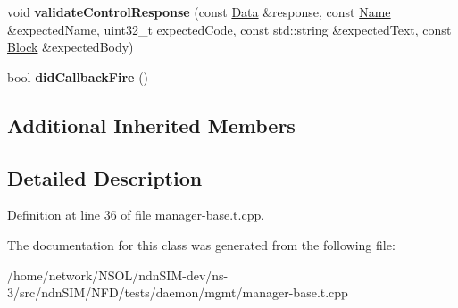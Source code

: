 \begin{DoxyCompactItemize}
\item 
void {\bfseries validate\+Control\+Response} (const \hyperlink{classndn_1_1Data}{Data} \&response, const \hyperlink{classndn_1_1Name}{Name} \&expected\+Name, uint32\+\_\+t expected\+Code, const std\+::string \&expected\+Text, const \hyperlink{classndn_1_1Block}{Block} \&expected\+Body)\hypertarget{classnfd_1_1tests_1_1ManagerBaseTest_acc3614de3d46edf6a6a5d465d7bc1a07}{}\label{classnfd_1_1tests_1_1ManagerBaseTest_acc3614de3d46edf6a6a5d465d7bc1a07}

\item 
bool {\bfseries did\+Callback\+Fire} ()\hypertarget{classnfd_1_1tests_1_1ManagerBaseTest_affeedd0c5b23c849698bf221c85ca355}{}\label{classnfd_1_1tests_1_1ManagerBaseTest_affeedd0c5b23c849698bf221c85ca355}

\end{DoxyCompactItemize}
\subsection*{Additional Inherited Members}


\subsection{Detailed Description}


Definition at line 36 of file manager-\/base.\+t.\+cpp.



The documentation for this class was generated from the following file\+:\begin{DoxyCompactItemize}
\item 
/home/network/\+N\+S\+O\+L/ndn\+S\+I\+M-\/dev/ns-\/3/src/ndn\+S\+I\+M/\+N\+F\+D/tests/daemon/mgmt/manager-\/base.\+t.\+cpp\end{DoxyCompactItemize}
